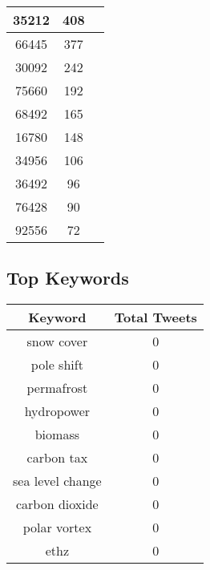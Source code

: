 \documentclass{article}\usepackage[T1]{fontenc}
\begin{document}
\begin{tabular}{|c|c|c|}
 \hline
35212 & 408\\ 
 \hline
66445 & 377\\ 
 \hline
30092 & 242\\ 
 \hline
75660 & 192\\ 
 \hline
68492 & 165\\ 
 \hline
16780 & 148\\ 
 \hline
34956 & 106\\ 
 \hline
36492 & 96\\ 
 \hline
76428 & 90\\ 
 \hline
92556 & 72\\ 
 \hline
\end{tabular}\subsection*{Top Keywords}\begin{tabular}{|c|c|}         \hline         Keyword & Total Tweets \\ 
 \hline
snow cover & 0\\ 
 \hline
pole shift & 0\\ 
 \hline
permafrost & 0\\ 
 \hline
hydropower & 0\\ 
 \hline
biomass & 0\\ 
 \hline
carbon tax & 0\\ 
 \hline
sea level change & 0\\ 
 \hline
carbon dioxide & 0\\ 
 \hline
polar vortex & 0\\ 
 \hline
ethz & 0\\ 
 \hline
\end{tabular}
\end{document}
